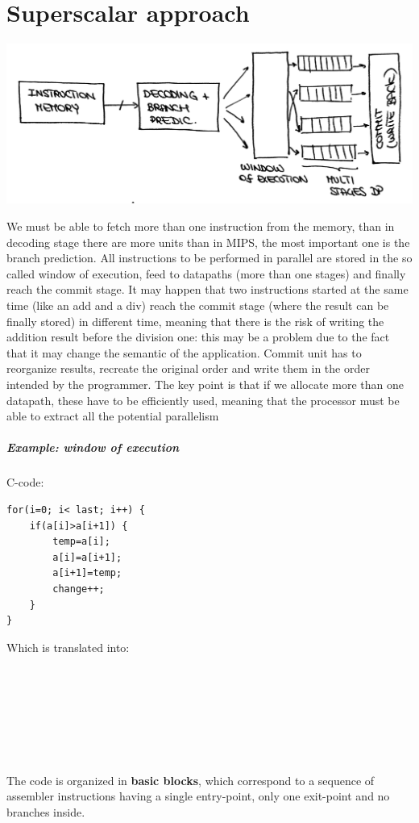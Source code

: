 \section{Superscalar approach}
\begin{center}
  \includegraphics[width=0.7\linewidth]{img/img3/3}
\end{center}

We must be able to fetch more than one instruction from the memory, than in decoding stage there are more units than in MIPS, the most important one is the branch prediction. All instructions to be performed in parallel are stored in the so called window of execution, feed to datapaths (more than one stages) and finally reach the commit stage. It may happen that two instructions started at the same time (like an add and a div) reach the commit stage (where the result can be finally stored) in different time, meaning that there is the risk of writing the addition result before the division one: this may be a problem due to the fact that it may change the semantic of the application. Commit unit has to reorganize results, recreate the original order and write them in the order intended by the programmer. The key point is that if we allocate more than one datapath, these have to be efficiently used, meaning that the processor must be able to extract all the potential parallelism

\subparagraph{Example: window of execution}

C-code:

\begin{verbatim}
for(i=0; i< last; i++) {
    if(a[i]>a[i+1]) {
        temp=a[i];
        a[i]=a[i+1];
        a[i+1]=temp;
        change++;
    }
}
\end{verbatim}
Which is translated into:

\begin{verbatim}







\end{verbatim}


The code is organized in \textbf{basic blocks}, which correspond to a sequence of assembler instructions having a single entry-point, only one exit-point and no branches inside.\\


